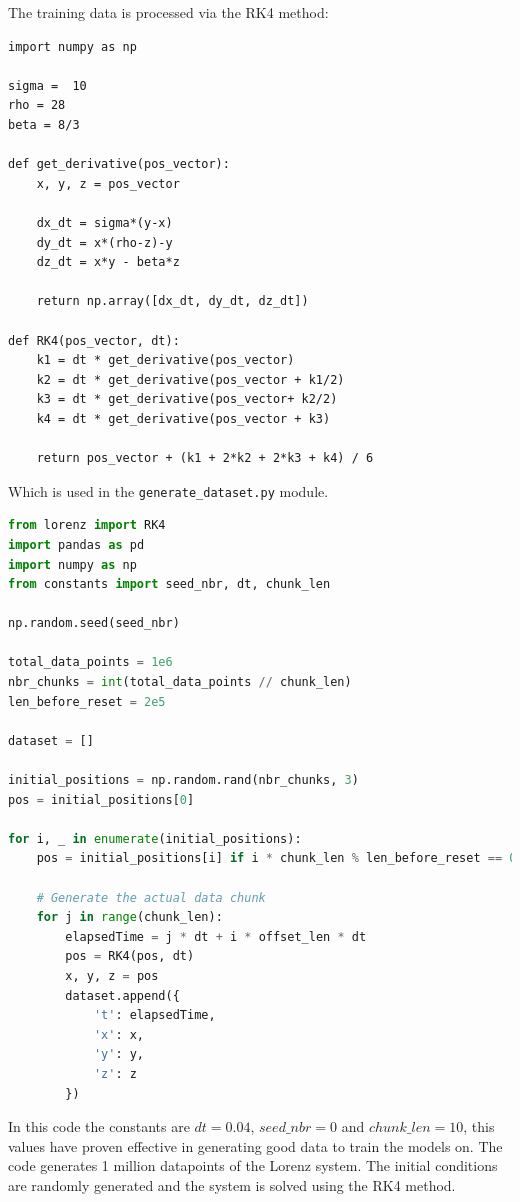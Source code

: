 \documentclass[11pt]{article}
\begin{document}
The training data is processed via the RK4 method:

\begin{lstlisting}
import numpy as np

sigma =  10
rho = 28
beta = 8/3

def get_derivative(pos_vector):
    x, y, z = pos_vector

    dx_dt = sigma*(y-x)
    dy_dt = x*(rho-z)-y
    dz_dt = x*y - beta*z

    return np.array([dx_dt, dy_dt, dz_dt])

def RK4(pos_vector, dt):
    k1 = dt * get_derivative(pos_vector)
    k2 = dt * get_derivative(pos_vector + k1/2)
    k3 = dt * get_derivative(pos_vector+ k2/2)
    k4 = dt * get_derivative(pos_vector + k3)

    return pos_vector + (k1 + 2*k2 + 2*k3 + k4) / 6

\end{lstlisting}


Which is used in the \texttt{generate\_dataset.py} module.

\begin{lstlisting}[language=Python]
from lorenz import RK4
import pandas as pd
import numpy as np
from constants import seed_nbr, dt, chunk_len

np.random.seed(seed_nbr)

total_data_points = 1e6
nbr_chunks = int(total_data_points // chunk_len)
len_before_reset = 2e5

dataset = []

initial_positions = np.random.rand(nbr_chunks, 3) 
pos = initial_positions[0]

for i, _ in enumerate(initial_positions):
    pos = initial_positions[i] if i * chunk_len % len_before_reset == 0 else pos
   
    # Generate the actual data chunk
    for j in range(chunk_len):
        elapsedTime = j * dt + i * offset_len * dt
        pos = RK4(pos, dt)
        x, y, z = pos
        dataset.append({
            't': elapsedTime,
            'x': x,
            'y': y,
            'z': z
        })
\end{lstlisting}

In this code the constants are $dt = 0.04$, $seed\_nbr = 0$ and $chunk\_len = 10$, this values have proven effective in generating good data to train the models on. The code generates 1 million datapoints of the Lorenz system. The initial conditions are randomly generated and the system is solved using the RK4 method.
\end{document}
